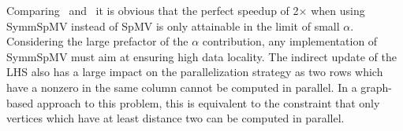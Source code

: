 Comparing~ and~ it is obvious that the perfect speedup of 2$\times$ when using \acrshort{SymmSpMV} instead of \acrshort{SpMV} is only attainable in the limit of small $\alpha$\@. %
Considering the large prefactor of the $\alpha$ contribution, any implementation of \acrshort{SymmSpMV} must aim at ensuring high data locality.
The indirect update of the LHS also has a large impact on the parallelization strategy as two rows which have a nonzero in the same column cannot be computed in parallel. In a graph-based approach to this problem, this is equivalent to the constraint that only vertices which have at least distance two can be computed in parallel.

\begin{comment}
\subsubsection{\GS and \SYMMGS}
Gauss-Seidel (\GS) is a solver having \DONE dependency. Contrary to the above kernels \GS is in-exact meaning it is an iterative method. \Cref{alg:GS} shows the Gauss-Seidel algorithm where its assumed that the diagonal entries of the matrix are stored as first entry in their corresponding rows.
\begin{algorithm}[H]
	\caption{GS Solve for $x$ : $Ax=b$} 
	\label{alg:GS}
	\begin{algorithmic}[1]
		\FOR{$row=1:nrows$}
		\STATE{$x[row]+=b[row]$}
		\FOR{$idx=rowPtr[row]+1:rowPtr[row+1]$}
		\STATE{$x[row] -= A[idx]*x[col[idx]]$} 
		\ENDFOR
		\STATE{$diag=A[rowPtr[row]]$}
		\STATE{$x[row]/=diag$}
		\ENDFOR
	\end{algorithmic}
\end{algorithm}
Regarding the in-core execution the kernel has same properties as of \acrshort{SpMV}, but requires an additional divide operation per row of the matrix. If the locality ($\alpha$ factor) is not disturbed due to pre-processing the kernel requires same data traffic as of \acrshort{SpMV}. The arithmetic intensity of \GS is the same as that of \acrshort{SpMV}, if we neglect the divide operation that occurs once per every row.
\begin{equation}
\label{eq:GS_intensity}
I_\mathrm{GS} = I_\mathrm{SPMV}
\end{equation}



In general for most of the algorithms one is interested in symmetric operator therefore commonly one would encounter symmetric variant of Gauss-Seidel, so called symmetric Gauss-Seidel (\SYMMGS). The algorithm remains same except that instead of just doing forward sweep shown in \Cref{alg:GS} one would follow it with a backward sweep \ie {\tt row=nrows:-1:1}. The intensity of \SYMMGS remains same as of \GS, as we do two times more flops and bring in proportional data.
\end{comment}

